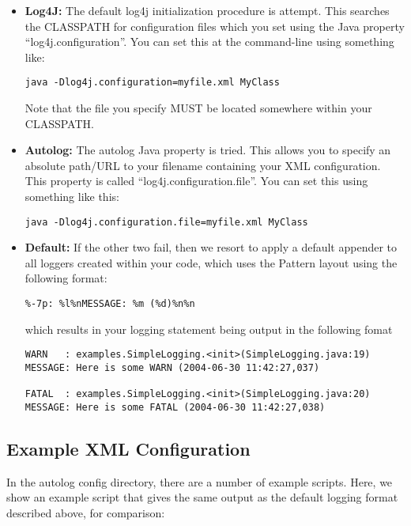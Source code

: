 \begin{itemize}
\item \textbf{Log4J:} \sloppypar The default log4j initialization procedure is attempt.  This
searches the CLASSPATH for configuration files which you
set using the Java property ``log4j.configuration''.  You can set
this at the command-line using something like:
\footnotesize
\begin{verbatim}
java -Dlog4j.configuration=myfile.xml MyClass
\end{verbatim}
\normalsize

Note that the file you specify MUST be located somewhere within your CLASSPATH. 
\item \textbf{Autolog:} The autolog Java property is tried.  This allows you
to specify an absolute path/URL to your filename containing your XML 
configuration.  This property is called ``log4j.configuration.file''. You can
set this using something like this:
\footnotesize
\begin{verbatim}
java -Dlog4j.configuration.file=myfile.xml MyClass
\end{verbatim}
\normalsize

\item \textbf{Default:} If the other two fail, then we resort to apply a default
appender to all loggers created within your code, which uses the
Pattern layout using the following format:

\footnotesize
\begin{verbatim}
%-7p: %l%nMESSAGE: %m (%d)%n%n
\end{verbatim}
\normalsize

\noindent which results in your logging statement being output in the following fomat


\footnotesize
\begin{verbatim}
WARN   : examples.SimpleLogging.<init>(SimpleLogging.java:19)
MESSAGE: Here is some WARN (2004-06-30 11:42:27,037)

FATAL  : examples.SimpleLogging.<init>(SimpleLogging.java:20)
MESSAGE: Here is some FATAL (2004-06-30 11:42:27,038)
\end{verbatim}
\normalsize
\end{itemize}

\subsection{Example XML Configuration}
\label{example}

In the autolog config directory, there are a number of example scripts.  Here,
we show an example script that gives the same output as the default
logging format described above, for comparison:

